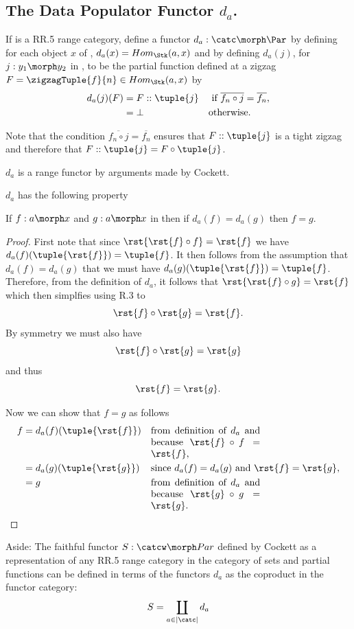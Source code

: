 
\subsection{The Data Populator Functor $d_a$.}
If \catcw is a RR.5 range category, define a functor $d_a: \catc \morph \Par$ by defining for each object $x$ of \catc, $d_a(x)=Hom_{\Stk}(a,x)$ and by defining $d_a(j)$, for $j:y_1 \morph y_2$ in \catc, to be the partial function  defined at a zigzag 
$F=\zigzagTuple{f}{n}\in Hom_{\Stk}(a,x)$ by
\begin{align*}
d_a(j)(F) &= F :: \tuple{j}  &&\mbox{ if $\overline{f_n \circ j} = \overline{f_n}$,} \\
             &=\bot        && \mbox{otherwise.}
\end{align*}

Note that the condition $\overline{f_n \circ j} = \overline{f_n}$ ensures
that $F :: \tuple{j}$ is a tight zigzag and therefore that
$F :: \tuple{j}= F \circ \tuple{j}$.

$d_a$ is a range functor by arguments made by Cockett. 

$d_a$ has the following property
\begin{lemma}
If $f: a \morph x$ and $g: a \morph x$ in \catcw then 
if $d_a(f)=d_a(g)$ then $f=g$.
\end{lemma}
\begin{proof}
First note that since $\rst{\rst{f} \circ f} = \rst{f}$ 
we have $d_a(f)(\tuple{\rst{f}})= \tuple{f}$.
It then follows from the assumption that $d_a(f)=d_a(g)$
that we must have 
$d_a(g)(\tuple{\rst{f}})= \tuple{f}$. 
Therefore, from the definition of $d_a$, it follows that
$\rst{\rst{f} \circ g} = \rst{f}$
which then simplfies using R.3 to
\[
\rst{f} \circ \rst{g} = \rst{f}.
\]
By symmetry we must also have
\[
\rst{f} \circ \rst{g} = \rst{g}
\]
and thus
\[
\rst{f} = \rst{g}.
\]

Now we can show that $f=g$ as follows
\begin{align*}
f &= d_a(f)(\tuple{\rst{f}}) 
                     && \mbox{\parbox[t]{4cm}{from definition of $d_a$ 
                               and because $\rst{f} \circ f = \rst{f}$,}}\\
  &= d_a(g)(\tuple{\rst{g}}) 
                     && \mbox{since $d_a(f)=d_a(g)$ and $\rst{f}=\rst{g}$,}\\
  &= g               && \mbox{\parbox[t]{4cm}{from definition of $d_a$ 
                               and because $\rst{g} \circ g = \rst{g}$.}}
\end{align*}
\end{proof}

 

Aside: The faithful functor $S: \catcw \morph Par$ defined by Cockett as a representation of any RR.5 range category in the category of sets and partial functions can be defined in terms of the functors $d_a$ as the coproduct in the functor category:
\[
S = \coprod_{a \in |\catc|}d_a
\] 
